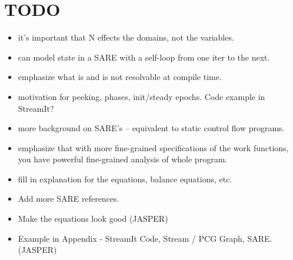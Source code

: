 \section{TODO}

\begin{itemize}

\item it's important that N effects the domains, not the variables.

\item can model state in a SARE with a self-loop from one iter to the next.

\item emphasize what is and is not resolvable at compile time.

\item motivation for peeking, phases, init/steady epochs.  Code
example in StreamIt?

\item more background on SARE's -- equivalent to static control flow
programs.

\item emphasize that with more fine-grained specifications of the work
functions, you have powerful fine-grained analysis of whole program.

\item fill in explanation for the equations, balance equations, etc.

\item Add more SARE references.

\item Make the equations look good (JASPER)

\item Example in Appendix - StreamIt Code, Stream / PCG Graph, SARE. (JASPER)

\end{itemize}

